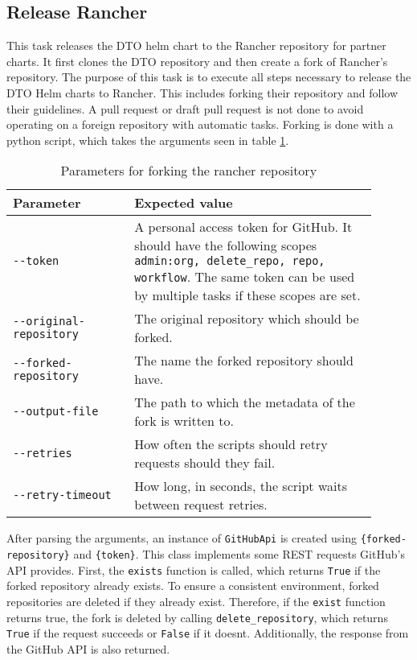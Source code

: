 \subsection{Release Rancher}\label{subsec:release-rancher}

This task releases the DTO helm chart to the Rancher repository for partner charts.
It first clones the DTO repository and then create a fork of Rancher's repository.
The purpose of this task is to execute all steps necessary to release the DTO Helm charts to Rancher.
This includes forking their repository and follow their guidelines.
A pull request or draft pull request is not done to avoid operating on a foreign repository with automatic tasks.
Forking is done with a python script, which takes the arguments seen in table \ref{tab:parameters-for-forking-the-rancher-repository}.

\begin{table}[H]
    \centering
    \caption{Parameters for forking the rancher repository}
    \label{tab:parameters-for-forking-the-rancher-repository}
    \begin{tabular}{p{0.3\linewidth}|p{0.6\linewidth}}
        Parameter & Expected value \\
        \hline
        \verb|--token| & A personal access token for GitHub.
            It should have the following scopes \verb|admin:org, delete_repo, repo, workflow|.
            The same token can be used by multiple tasks if these scopes are set. \\
        \verb|--original-repository| & The original repository which should be forked. \\
        \verb|--forked-repository| & The name the forked repository should have. \\
        \verb|--output-file| & The path to which the metadata of the fork is written to. \\
        \verb|--retries| & How often the scripts should retry requests should they fail. \\
        \verb|--retry-timeout| & How long, in seconds, the script waits between request retries. \\
    \end{tabular}
\end{table}

After parsing the arguments, an instance of \verb|GitHubApi| is created using \verb|{forked-repository}| and \verb|{token}|.
This class implements some REST requests GitHub's API provides.
First, the \verb|exists| function is called, which returns \verb|True| if the forked repository already exists.
To ensure a consistent environment, forked repositories are deleted if they already exist.
Therefore, if the \verb|exist| function returns true, the fork is deleted by calling \verb|delete_repository|, which returns \verb|True| if the request succeeds or \verb|False| if it doesnt.
Additionally, the response from the GitHub API is also returned.

